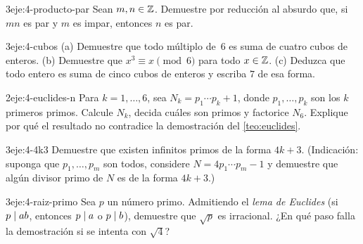 \begin{ejercicio}{3}{eje:4-producto-par}
Sean $m,n\in\mathbb{Z}$. Demuestre por reducción al absurdo que, si $mn$ es par y $m$ es impar, entonces $n$ es par.
\end{ejercicio}

\begin{ejercicio}{3}{eje:4-cubos}
(a) Demuestre que todo múltiplo de~6 es suma de cuatro cubos de enteros. (b) Demuestre que $x^{3}\equiv x\pmod 6$ para todo $x\in\mathbb{Z}$. (c) Deduzca que todo entero es suma de cinco cubos de enteros y escriba $7$ de esa forma.
\end{ejercicio}

\begin{ejercicio}{2}{eje:4-euclides-n}
Para $k=1,\dots,6$, sea $N_k=p_1\cdots p_k+1$, donde $p_1,\dots,p_k$ son los $k$ primeros primos. Calcule $N_k$, decida cuáles son primos y factorice $N_6$. Explique por qué el resultado no contradice la demostración del \cref{teo:euclides}.
\end{ejercicio}

\begin{ejercicio}{3}{eje:4-4k3}
Demuestre que existen infinitos primos de la forma $4k+3$. (Indicación: suponga que $p_1,\dots,p_m$ son todos, considere $N=4p_1\cdots p_m-1$ y demuestre que algún divisor primo de $N$ es de la forma $4k+3$.)
\end{ejercicio}

\begin{ejercicio}{3}{eje:4-raiz-primo}
Sea $p$ un número primo. Admitiendo el \emph{lema de Euclides} (si $p\mid ab$, entonces $p\mid a$ o $p\mid b$), demuestre que $\sqrt{p}$ es irracional. ¿En qué paso falla la demostración si se intenta con $\sqrt4$?
\end{ejercicio}
